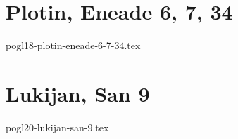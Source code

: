 \documentclass[a4paper,12pt,twoside]{report}
\begin{document}

\chapter{Plotin, Eneade 6, 7, 34}

{pogl18-plotin-eneade-6-7-34.tex}




\chapter{Lukijan, San 9}

{pogl20-lukijan-san-9.tex}



\tableofcontents
\end{document}
